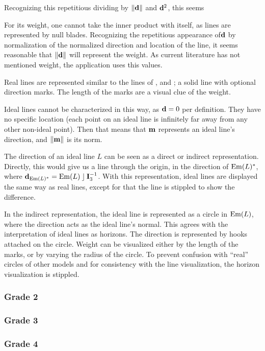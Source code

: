Recognizing this repetitious dividing by $\left\|\mathbf{d}\right\|$ and $\mathbf{d}^2$, this seems

For its weight, one cannot take the inner product with itself, as lines are represented by null blades.  Recognizing the repetitious appearance of$\mathbf{d}$ by normalization of the normalized direction and location of the line, it seems reasonable that $\left\|\mathbf{d}\right\|$ will represent the weight.  As current literature has not mentioned weight, the application uses this values.

Real lines are represented similar to the lines of \pga, \cga and \cbga; a solid line with optional direction marks.  The length of the marks are a visual clue of the weight.

Ideal lines cannot be characterized in this way, as $\mathbf{d} = 0$ per definition.  They have no specific location (each point on an ideal line is infinitely far away from any other non-ideal point).  Then that means that $\mathbf{m}$ represents an ideal line's direction, and $\left\|\mathbf{m}\right\|$ is its norm.

The direction of an ideal line $L$ can be seen as a direct or indirect representation.  Directly, this would give us a line through the origin, in the direction of $\operatorname{Em}(L)^\ast$, where $\mathbf{d}_{\operatorname{Em}(L)^\ast} = \operatorname{Em}(L) \mathbin{\rfloor} \mathbf{I}_3^{-1}$.  With this representation, ideal lines are displayed the same way as real lines, except for that the line is stippled to show the difference. 

In the indirect representation, the ideal line is represented as a circle in $\operatorname{Em}(L)$, where the direction acts as the ideal line's normal.  This agrees with the interpretation of ideal lines as horizons.  The direction is represented by hooks attached on the circle.  Weight can be visualized either by the length of the marks, or by varying the radius of the circle.  To prevent confusion with ``real'' circles of other models and for consistency with the line visualization, the horizon visualization is stippled.



\subsubsection{Grade 2}


\subsubsection{Grade 3}


\subsubsection{Grade 4}


